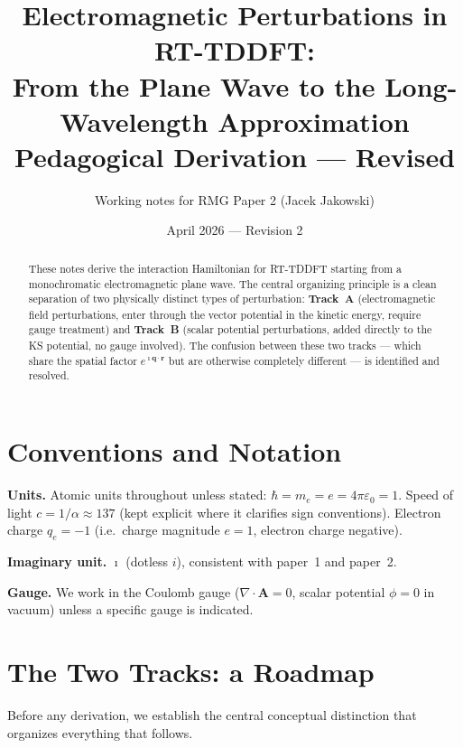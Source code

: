 \documentclass[11pt]{article}
\title{%
  Electromagnetic Perturbations in RT-TDDFT:\\
  From the Plane Wave to the Long-Wavelength Approximation\\[4pt]
  {\large Pedagogical Derivation --- Revised}%
}
\author{Working notes for RMG Paper 2 (Jacek Jakowski)}
\date{April 2026 --- Revision 2}
\newcommand{\iunit}{\imath}
\newcommand{\Avec}{\mathbf{A}}
\begin{document}
\maketitle

\begin{abstract}
These notes derive the interaction Hamiltonian for RT-TDDFT starting
from a monochromatic electromagnetic plane wave.
The central organizing principle is a clean separation of two
physically distinct types of perturbation:
\textbf{Track~A} (electromagnetic field perturbations, enter through
the vector potential in the kinetic energy, require gauge treatment)
and \textbf{Track~B} (scalar potential perturbations, added directly
to the KS potential, no gauge involved).
The confusion between these two tracks --- which share the spatial
factor $e^{\iunit\mathbf{q}\cdot\mathbf{r}}$ but are otherwise
completely different --- is identified and resolved.
\end{abstract}

\tableofcontents
\newpage

\section{Conventions and Notation}

\noindent\textbf{Units.} Atomic units throughout unless stated:
$\hbar=m_e=e=4\pi\varepsilon_0=1$.
Speed of light $c=1/\alpha\approx137$ (kept explicit where it
clarifies sign conventions).
Electron charge $q_e=-1$ (i.e.\ charge magnitude $e=1$, electron
charge negative).

\noindent\textbf{Imaginary unit.} $\iunit$ (dotless $i$), consistent
with paper~1 and paper~2.

\noindent\textbf{Gauge.} We work in the Coulomb gauge
($\nabla\cdot\Avec=0$, scalar potential $\phi=0$ in vacuum) unless
a specific gauge is indicated.

\section{The Two Tracks: a Roadmap}

Before any derivation, we establish the central conceptual
distinction that organizes everything that follows.
\end{document}
